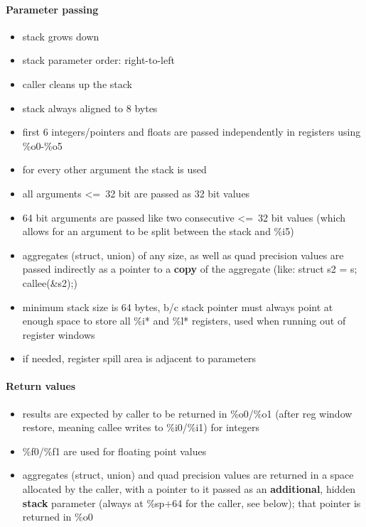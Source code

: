 \paragraph{Parameter passing}
\begin{itemize}
\item stack grows down
\item stack parameter order: right-to-left
\item caller cleans up the stack
\item stack always aligned to 8 bytes
\item first 6 integers/pointers and floats are passed independently in registers using \%o0-\%o5
\item for every other argument the stack is used
\item all arguments \textless=\ 32 bit are passed as 32 bit values
\item 64 bit arguments are passed like two consecutive \textless=\ 32 bit values (which allows for an argument to be split between the stack and \%i5)
\item aggregates (struct, union) of any size, as well as quad precision values are passed indirectly as a pointer to a {\bf copy} of the aggregate (like: struct s2 = s; callee(\&s2);)
\item minimum stack size is 64 bytes, b/c stack pointer must always point at enough space to store all \%i* and \%l* registers, used when running out of register windows
\item if needed, register spill area is adjacent to parameters
\end{itemize}

\paragraph{Return values}

\begin{itemize}
\item results are expected by caller to be returned in \%o0/\%o1 (after reg window restore, meaning callee writes to \%i0/\%i1) for integers
\item \%f0/\%f1 are used for floating point values
\item aggregates (struct, union) and quad precision values are returned in a space allocated by the caller, with a pointer to it passed
as an {\bf additional}, hidden {\bf stack} parameter (always at \%sp+64 for the caller, see below); that pointer is returned in \%o0
\end{itemize}

